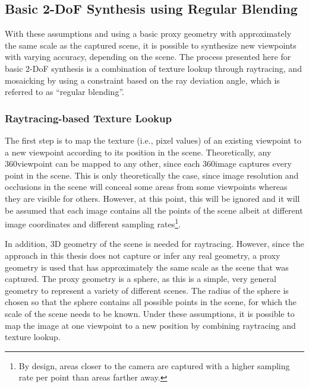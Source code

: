 \subsection{Basic 2-DoF Synthesis using Regular Blending} \label{subsec:basic-synthesis}
With these assumptions and using a basic proxy geometry with approximately the same scale as the captured scene, it is possible to synthesize new viewpoints with varying accuracy, depending on the scene. The process presented here for basic 2-DoF synthesis is a combination of texture lookup through raytracing, and mosaicking by using a constraint based on the ray deviation angle, which is referred to as ``regular blending''.

\subsubsection{Raytracing-based Texture Lookup}
The first step is to map the texture (i.e., pixel values) of an existing viewpoint to a new viewpoint according to its position in the scene. Theoretically, any 360\degree viewpoint can be mapped to any other, since each 360\degree image captures every point in the scene. This is only theoretically the case, since image resolution and occlusions in the scene will conceal some areas from some viewpoints whereas they are visible for others. However, at this point, this will be ignored and it will be assumed that each image contains all the points of the scene albeit at different image coordinates and different sampling rates\footnote{By design, areas closer to the camera are captured with a higher sampling rate per point than areas farther away.}. 

In addition, 3D geometry of the scene is needed for raytracing. However, since the approach in this thesis does not capture or infer any real geometry, a proxy geometry is used that has approximately the same scale as the scene that was captured. The proxy geometry is a sphere, as this is a simple, very general geometry to represent a variety of different scenes. The radius of the sphere is chosen so that the sphere contains all possible points in the scene, for which the scale of the scene needs to be known. Under these assumptions, it is possible to map the image at one viewpoint to a new position by combining raytracing and texture lookup.



